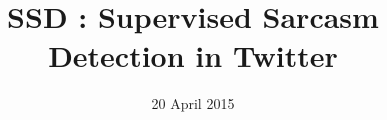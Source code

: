 \documentclass[10pt,conference]{IEEEtran}
\begin{document}
\title{SSD : Supervised Sarcasm Detection in Twitter}

\author{
}


\date{20 April 2015}

\maketitle




%
%








%
%
%



{\footnotesize}
\end{document}
